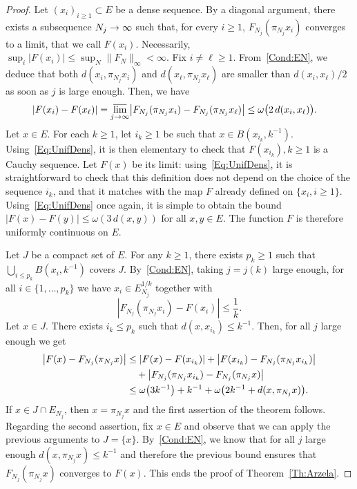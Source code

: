 \documentclass[AHL,Unicode,longabstracts]{cedram}
\theoremstyle{plain}
\let\originalleft\left
\let\originalright\right
\renewcommand{\left}{\mathopen{}\mathclose\bgroup\originalleft}
\renewcommand{\right}{\aftergroup\egroup\originalright}
\renewcommand*{\to}{\mathchoice{\longrightarrow}{\rightarrow}{\rightarrow}{\rightarrow}}
\begin{document}
\begin{proof}
Let $(x_i)_{i\geq 1} \subset E$ be a dense sequence. By a diagonal argument, there exists a subsequence $N_j \to\infty$ such that, for every $i\geq 1$, $F_{N_j}(\pi_{N_j} x_i)$ converges to a limit, that we call $F(x_i)$. Necessarily, $\sup_i |F(x_i)| \leq \sup_N \|F_N\|_{\infty}<\infty$. Fix $i\ne \ell \geq 1$. From~\eqref{Cond:EN}, we deduce that both $d(x_i,\pi_{N_j} x_i)$ and $d(x_\ell,\pi_{N_j} x_\ell)$ are smaller than $d(x_i,x_\ell)/2$ as soon as $j$ is large enough. Then, we have
\begin{equation}\label{Eq:UnifDens}
|F(x_i) - F(x_\ell)| = \varlimsup_{j\to\infty} \left|F_{N_j}(\pi_{N_j} x_i) - F_{N_j}(\pi_{N_j} x_\ell)\right|\leq \omega\bigl(2\, d(x_i,x_{\ell})\bigr).\quad
\end{equation}
Let $x\in E$. For each $k\geq 1$, let $i_k\geq 1$ be such that $x \in B(x_{i_k},k^{-1})$. Using~\eqref{Eq:UnifDens}, it is then elementary to check that $F(x_{i_k}),k\geq 1$ is a Cauchy sequence. Let $F(x)$ be its limit: using~\eqref{Eq:UnifDens}, it is straightforward to check that this definition does not depend on the choice of the sequence $i_k$, and that it matches with the map $F$ already defined on $\{x_i, i\ge 1\}$. Using~\eqref{Eq:UnifDens} once again, it is simple to obtain the bound $|F(x)-F(y)| \leq \omega(3\,d(x,y))$ for all $x,y\in E$. The function $F$ is therefore uniformly continuous on $E$.

Let $J$ be a compact set of $E$. For any $k\geq 1$, there exists $p_k\geq 1$ such that $\bigcup_{i\leq p_k} B(x_{i},k^{-1})$ covers $J$. By~\eqref{Cond:EN}, taking $j=j(k)$ large enough, for all $i\in\{1,\dots,p_k\}$ we have $x_i \in E_{N_j}^{1/k}$ together with
\begin{equation}
|F_{N_j}(\pi_{N_j} x_{i})-F(x_{i})| \leq \frac{1}{k} .
\end{equation}
Let $x\in J$. There exists $i_k \leq p_k$ such that $d(x,x_{i_k})\leq k^{-1}$. Then, for all $j$ large enough we get
\begin{align*}
\left|F(x)-F_{N_j}(\pi_{N_j} x)\right| &\leq |F(x)-F(x_{i_k})| + \left|F(x_{i_k})-F_{N_j}(\pi_{N_j} x_{i_k})\right|\\
&\quad+ \left|F_{N_j}(\pi_{N_j} x_{i_k})-F_{N_j}(\pi_{N_j} x)\right|\\
&\leq \omega\left(3 k^{-1}\right) + k^{-1} + \omega\left(2k^{-1}+d(x,\pi_{N_j} x)\right ).
\end{align*}
If $x\in J\cap E_{N_j}$, then $x=\pi_{N_j} x$ and the first assertion of the theorem follows. Regarding the second assertion, fix $x\in E$ and observe that we can apply the previous arguments to $J=\{x\}$. By~\eqref{Cond:EN}, we know that for all $j$ large enough $d(x,\pi_{N_j} x)\le k^{-1}$ and therefore the previous bound ensures that $F_{N_j}(\pi_{N_j} x)$ converges to $F(x)$. This ends the proof of Theorem~\ref{Th:Arzela}.
\end{proof}
\end{document}
